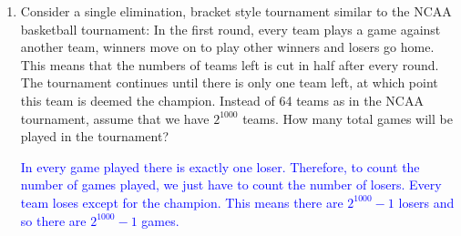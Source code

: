 \documentclass{article}    %
\begin{document}
\begin{enumerate}
\item Consider a single elimination, bracket style tournament similar to the NCAA basketball tournament: In the first round, every team plays a game against another team, winners move on to play other winners and losers go home.  This means that the numbers of teams left is cut in half after every round.  The tournament continues until there is only one team left, at which point this team is deemed the champion.  Instead of 64 teams as in the NCAA tournament, assume that we have $2^{1000}$ teams.  How many total games will be played in the tournament?

\medskip

\textcolor{blue}{In every game played there is exactly one loser.  Therefore, to count the number of games played, we just have to count the number of losers.  Every team loses except for the champion.  This means there are $2^{1000}-1$ losers and so there are $2^{1000}-1$ games.}

\end{enumerate}
\end{document}
